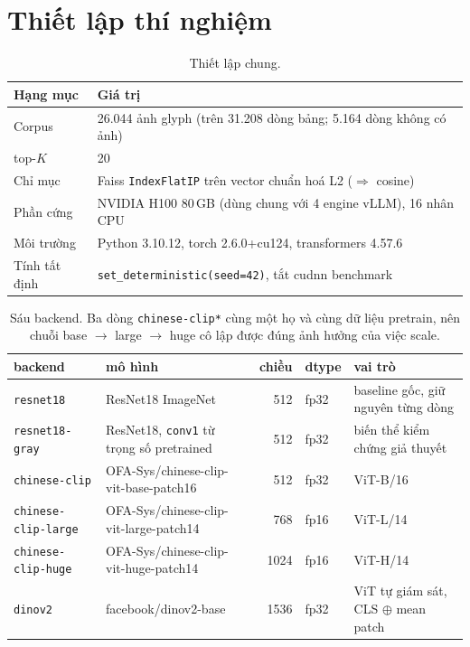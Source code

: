 \documentclass[11pt,a4paper]{article}
\newcommand{\code}[1]{\texttt{#1}}
\begin{document}
\section{Thiết lập thí nghiệm}

\begin{table}[h]
\centering
\begin{tabular}{ll}
\toprule
Hạng mục & Giá trị \\
\midrule
Corpus & 26.044 ảnh glyph (trên 31.208 dòng bảng; 5.164 dòng không có ảnh) \\
top-$K$ & 20 \\
Chỉ mục & Faiss \code{IndexFlatIP} trên vector chuẩn hoá L2 ($\Rightarrow$ cosine) \\
Phần cứng & NVIDIA H100 80\,GB (dùng chung với 4 engine vLLM), 16 nhân CPU \\
Môi trường & Python 3.10.12, torch 2.6.0+cu124, transformers 4.57.6 \\
Tính tất định & \code{set\_deterministic(seed=42)}, tắt cudnn benchmark \\
\bottomrule
\end{tabular}
\caption{Thiết lập chung.}
\end{table}

\begin{table}[h]
\centering
\small
\begin{tabular}{llrll}
\toprule
backend & mô hình & chiều & dtype & vai trò \\
\midrule
\code{resnet18} & ResNet18 ImageNet & 512 & fp32 & baseline gốc, giữ nguyên từng dòng \\
\code{resnet18-gray} & ResNet18, \code{conv1} từ trọng số pretrained & 512 & fp32 & biến thể kiểm chứng giả thuyết \\
\code{chinese-clip} & OFA-Sys/chinese-clip-vit-base-patch16 & 512 & fp32 & ViT-B/16 \\
\code{chinese-clip-large} & OFA-Sys/chinese-clip-vit-large-patch14 & 768 & fp16 & ViT-L/14 \\
\code{chinese-clip-huge} & OFA-Sys/chinese-clip-vit-huge-patch14 & 1024 & fp16 & ViT-H/14 \\
\code{dinov2} & facebook/dinov2-base & 1536 & fp32 & ViT tự giám sát, CLS $\oplus$ mean patch \\
\bottomrule
\end{tabular}
\caption{Sáu backend. Ba dòng \code{chinese-clip*} cùng một họ và cùng dữ liệu pretrain, nên chuỗi
base $\to$ large $\to$ huge cô lập được đúng ảnh hưởng của việc scale.}
\end{table}
\end{document}
